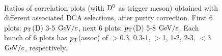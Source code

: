 \begin{figure}[h]
 \\
 \caption{Ratios of correlation plots (with ${\rm D^0}$ as trigger meson) obtained with different associated DCA selections, after purity correction. First 6 plots: $p_{\rm T}$(D) 3-5 $\mathrm{GeV}/c$, next 6 plots: $p_{\rm T}$(D) 5-8 $\mathrm{GeV}/c$. Each bunch of 6 plots has $p_{\rm T}$(assoc) of $>$0.3, 0.3-1, $>$1, 1-2, 2-3, $<$3 $\mathrm{GeV}/c$, respectively.}
\label{fig:DCAvarData}
\end{figure}

